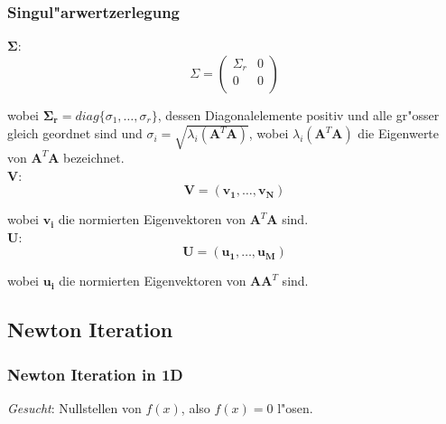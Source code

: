 \documentclass[german, 10pt, a4paper, twocolumn]{scrartcl}
\begin{document}
\subsubsection{Singul"arwertzerlegung}


$\mathbf{\Sigma}$:\\
\begin{displaymath}
	\Sigma = \left (
		\begin{array}{cc}
			\Sigma_r &	0\\
			0 &		0\\
		\end{array}
	\right )
\end{displaymath}

wobei $\mathbf{\Sigma_r}=diag\{\sigma_1,\ldots,\sigma_r\}$, dessen Diagonalelemente positiv und alle gr"osser gleich geordnet sind und $\sigma_i=\sqrt{\lambda_i(\mathbf{A}^T\mathbf{A})}$, wobei $\lambda_i(\mathbf{A}^T\mathbf{A})$ die Eigenwerte von $\mathbf{A}^T\mathbf{A}$ bezeichnet.\\

$\mathbf{V}$:\\
\begin{displaymath}
	\mathbf{V}=\left (
		\mathbf{v_1},\ldots,\mathbf{v_N}
	\right )
\end{displaymath}

wobei $\mathbf{v_i}$ die normierten Eigenvektoren von $\mathbf{A}^T\mathbf{A}$ sind.\\

$\mathbf{U}$:\\
\begin{displaymath}
	\mathbf{U}=\left (
		\mathbf{u_1},\ldots,\mathbf{u_M}
	\right )
\end{displaymath}

wobei $\mathbf{u_i}$ die normierten Eigenvektoren von $\mathbf{A}\mathbf{A}^T$ sind.

\subsection{Newton Iteration}

\subsubsection{Newton Iteration in 1D}


\textit{Gesucht}: Nullstellen von $f(x)$, also $f(x)=0$ l"osen.\\
\end{document}

